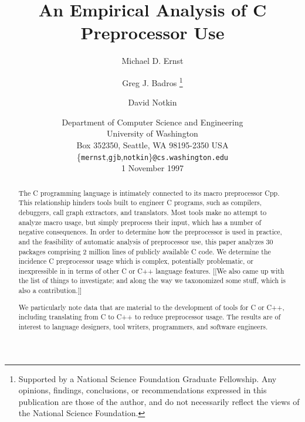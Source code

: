 \documentclass[10pt]{article}
\def\numpackages{30}
\def\numlines{2 million}
\begin{document}
% 


\title{An Empirical Analysis of C Preprocessor Use}

\author{Michael D. Ernst%
  \and Greg J. Badros%
  \thanks{Supported by a National Science Foundation
    Graduate Fellowship. Any opinions, findings, conclusions, or
    recommendations expressed in this publication are those of the
    author, and do not necessarily reflect the views of the National
    Science Foundation.}
  \and David Notkin}

\date{%
Department of Computer Science and Engineering \\
University of Washington \\
Box 352350, Seattle, WA  98195-2350  USA \\
{\small \{{\tt mernst},{\tt gjb},{\tt notkin}\}{\tt @cs.washington.edu}} \\
1 November 1997}  

\maketitle

\begin{abstract}
  The C programming language is intimately connected to its macro
  preprocessor Cpp.  This relationship hinders tools built to engineer C
  programs, such as compilers, debuggers, call graph extractors, and
  translators.  Most tools make no attempt to analyze macro usage, but simply
  preprocess their input, which has a number of negative consequences.  In
  order to determine how the preprocessor is used in practice, and the
  feasibility of automatic analysis of preprocessor use, this paper
  analyzes {\numpackages} packages comprising {\numlines} lines of publicly
  available C code.  We determine the incidence C preprocessor usage which
  is complex, potentially problematic, or inexpressible in in terms of
  other C or C++ language features.
[[We also came up with the list of things to investigate; and along the way
we taxonomized some stuff, which is also a contribution.]]

  We particularly note data that are
  material to the development of tools for C or C++, including translating
  from C to C++ to reduce preprocessor usage.  The results are of interest
  to language designers, tool writers, programmers, and software engineers.
\end{abstract}
\end{document}
